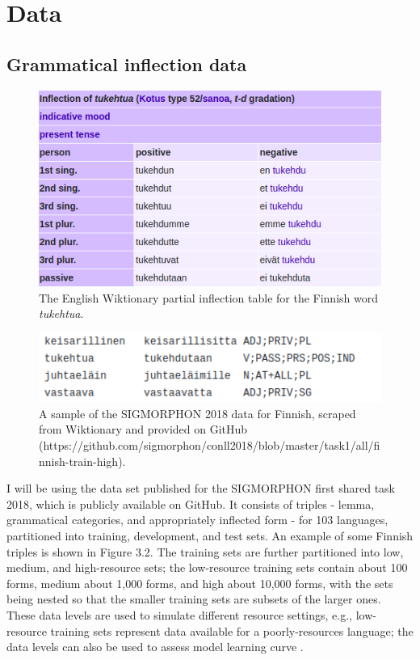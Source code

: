 \chapter{Data}

\section{Grammatical inflection data}

\begin{figure}[t]
\includegraphics[width=12cm]{images/tukehtua.png}
\centering
\caption{The English Wiktionary partial inflection table for the Finnish word \textit{tukehtua}.}
\end{figure}

\begin{figure}[t]
\includegraphics[width=12cm]{images/sigmorphon2018_fn.png}
\centering
\caption{A sample of the SIGMORPHON 2018 data for Finnish, scraped from Wiktionary and provided on GitHub (https://github.com/sigmorphon/conll2018/blob/master/task1/all/finnish-train-high).}
\end{figure}

I will be using the data set published for the SIGMORPHON first shared task 2018, which is publicly available on GitHub. It consists of triples - lemma, grammatical categories, and appropriately inflected form - for 103 languages, partitioned into training, development, and test sets. An example of some Finnish triples is shown in Figure 3.2. The training sets are further partitioned into low, medium, and high-resource sets; the low-resource training sets contain about 100 forms, medium about 1,000 forms, and high about 10,000 forms, with the sets being nested so that the smaller training sets are subsets of the larger ones. These data levels are used to simulate different resource settings, e.g., low-resource training sets represent data available for a poorly-resources language; the data levels can also be used to assess model learning curve \parencite{Cotterell2018b}.

